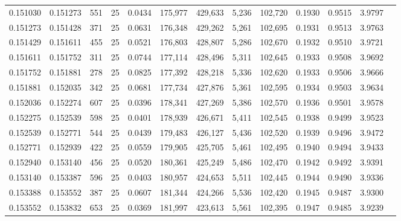 \begin{tabular}{rrrrrrrrrrrrr}
0.151030 & 0.151273 &   551 &  25 &                                     0.0434 & 175,977 & 429,633 &   5,236 & 102,720 & 0.1930 & 0.9515 & 3.9797 \\
0.151273 & 0.151428 &   371 &  25 &                                     0.0631 & 176,348 & 429,262 &   5,261 & 102,695 & 0.1931 & 0.9513 & 3.9763 \\
0.151429 & 0.151611 &   455 &  25 &                                     0.0521 & 176,803 & 428,807 &   5,286 & 102,670 & 0.1932 & 0.9510 & 3.9721 \\
0.151611 & 0.151752 &   311 &  25 &                                     0.0744 & 177,114 & 428,496 &   5,311 & 102,645 & 0.1933 & 0.9508 & 3.9692 \\
0.151752 & 0.151881 &   278 &  25 &                                     0.0825 & 177,392 & 428,218 &   5,336 & 102,620 & 0.1933 & 0.9506 & 3.9666 \\
0.151881 & 0.152035 &   342 &  25 &                                     0.0681 & 177,734 & 427,876 &   5,361 & 102,595 & 0.1934 & 0.9503 & 3.9634 \\
0.152036 & 0.152274 &   607 &  25 &                                     0.0396 & 178,341 & 427,269 &   5,386 & 102,570 & 0.1936 & 0.9501 & 3.9578 \\
0.152275 & 0.152539 &   598 &  25 &                                     0.0401 & 178,939 & 426,671 &   5,411 & 102,545 & 0.1938 & 0.9499 & 3.9523 \\
0.152539 & 0.152771 &   544 &  25 &                                     0.0439 & 179,483 & 426,127 &   5,436 & 102,520 & 0.1939 & 0.9496 & 3.9472 \\
0.152771 & 0.152939 &   422 &  25 &                                     0.0559 & 179,905 & 425,705 &   5,461 & 102,495 & 0.1940 & 0.9494 & 3.9433 \\
0.152940 & 0.153140 &   456 &  25 &                                     0.0520 & 180,361 & 425,249 &   5,486 & 102,470 & 0.1942 & 0.9492 & 3.9391 \\
0.153140 & 0.153387 &   596 &  25 &                                     0.0403 & 180,957 & 424,653 &   5,511 & 102,445 & 0.1944 & 0.9490 & 3.9336 \\
0.153388 & 0.153552 &   387 &  25 &                                     0.0607 & 181,344 & 424,266 &   5,536 & 102,420 & 0.1945 & 0.9487 & 3.9300 \\
0.153552 & 0.153832 &   653 &  25 &                                     0.0369 & 181,997 & 423,613 &   5,561 & 102,395 & 0.1947 & 0.9485 & 3.9239 \\

\end{tabular}
